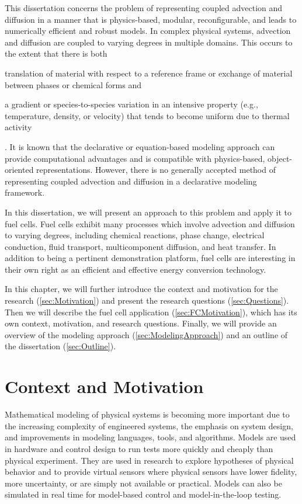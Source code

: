 This dissertation concerns the problem of representing coupled advection and diffusion in a manner that is physics-based, modular, reconfigurable, and leads to numerically efficient and robust models.  In complex physical systems, advection and diffusion are coupled to varying degrees in multiple domains.  This occurs to the extent that there is both \begin{inparaenum}[(1)] \item translation of material with respect to a reference frame or exchange of material between phases or chemical forms and \item a gradient or species-to-species variation in an intensive property (e.g., temperature, density, or velocity) that tends to become uniform due to thermal activity\end{inparaenum}.  It is known that the declarative or equation-based modeling approach can provide computational advantages and is compatible with physics-based, object-oriented representations.  However, there is no generally accepted method of representing coupled advection and diffusion in a declarative modeling framework.

In this dissertation, we will present an approach to this problem and apply it to fuel cells.  Fuel cells exhibit many processes which involve advection and diffusion to varying degrees, including chemical reactions, phase change, electrical conduction, fluid transport, multicomponent diffusion, and heat transfer.  In addition to being a pertinent demonstration platform, fuel cells are interesting in their own right as an efficient and effective energy conversion technology.

In this chapter, we will further introduce the context and motivation for the research (\autoref{sec:Motivation}) and present the research questions (\autoref{sec:Questions}).  Then we will describe the fuel cell application (\autoref{sec:FCMotivation}), which has its own context, motivation, and research questions.  Finally, we will provide an overview of the modeling approach (\autoref{sec:ModelingApproach}) and an outline of the dissertation (\autoref{sec:Outline}).



\section{Context and Motivation}
\label{sec:Motivation}

Mathematical modeling of physical systems is becoming more important due to the increasing complexity of engineered systems, the emphasis on system design, and improvements in modeling languages, tools, and algorithms.  Models are used in hardware and control design to run tests more quickly and cheaply than physical experiment.  They are used in research to explore hypotheses of physical behavior and to provide virtual sensors where physical sensors have lower fidelity, more uncertainty, or are simply not available or practical.  Models can also be simulated in real time for model-based control and model-in-the-loop testing.

